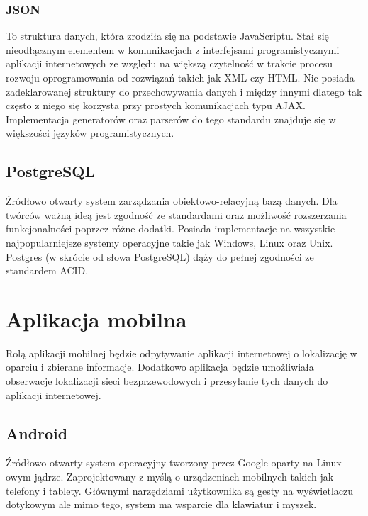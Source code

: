 
\subsubsection{JSON}
To struktura danych, która zrodziła się na podstawie JavaScriptu.\cite{JsonWiki} Stał się nieodłącznym elementem w komunikacjach z interfejsami programistycznymi aplikacji internetowych ze względu na większą czytelność w trakcie procesu rozwoju oprogramowania od rozwiązań takich jak XML czy HTML. Nie posiada zadeklarowanej struktury do przechowywania danych i między innymi dlatego tak często z niego się korzysta przy prostych komunikacjach typu AJAX. Implementacja generatorów oraz parserów do tego standardu znajduje się w większości języków programistycznych.


\subsection{PostgreSQL}
Źródłowo otwarty system zarządzania obiektowo-relacyjną bazą danych. Dla twórców ważną ideą jest zgodność ze standardami oraz możliwość rozszerzania funkcjonalności poprzez różne dodatki. Posiada implementacje na wszystkie najpopularniejsze systemy operacyjne takie jak Windows, Linux oraz Unix. Postgres (w skrócie od słowa PostgreSQL) dąży do pełnej zgodności ze standardem ACID.\cite{PostgresWiki}

\section{Aplikacja mobilna}
Rolą aplikacji mobilnej będzie odpytywanie aplikacji internetowej o lokalizację w oparciu i zbierane informacje. Dodatkowo aplikacja będzie umożliwiała obserwacje lokalizacji sieci bezprzewodowych i przesyłanie tych danych do aplikacji internetowej.

\subsection{Android}
Źródłowo otwarty system operacyjny tworzony przez Google oparty na Linux-owym jądrze. Zaprojektowany z myślą o urządzeniach mobilnych takich jak telefony i tablety. Głównymi narzędziami użytkownika są gesty na wyświetlaczu dotykowym ale mimo tego, system ma wsparcie dla klawiatur i myszek.\cite{AndroidWiki}

